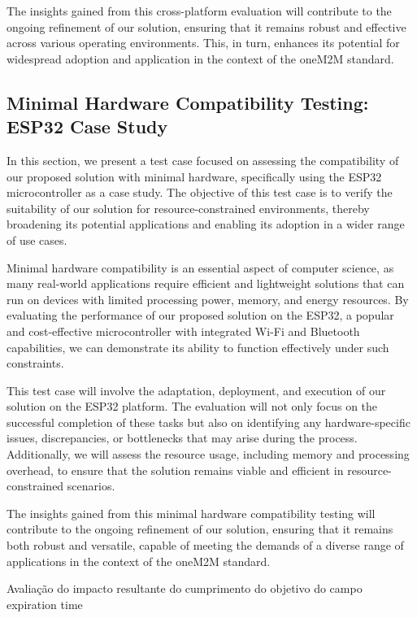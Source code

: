 \documentclass[a4paper,fleqn]{cas-dc}
\begin{document}
The insights gained from this cross-platform evaluation will contribute to the ongoing refinement of our solution, ensuring that it remains robust and effective across various operating environments. This, in turn, enhances its potential for widespread adoption and application in the context of the oneM2M standard.

\subsection{Minimal Hardware Compatibility Testing: ESP32 Case Study}

In this section, we present a test case focused on assessing the compatibility of our proposed solution with minimal hardware, specifically using the ESP32 microcontroller as a case study. The objective of this test case is to verify the suitability of our solution for resource-constrained environments, thereby broadening its potential applications and enabling its adoption in a wider range of use cases.

Minimal hardware compatibility is an essential aspect of computer science, as many real-world applications require efficient and lightweight solutions that can run on devices with limited processing power, memory, and energy resources. By evaluating the performance of our proposed solution on the ESP32, a popular and cost-effective microcontroller with integrated Wi-Fi and Bluetooth capabilities, we can demonstrate its ability to function effectively under such constraints.

This test case will involve the adaptation, deployment, and execution of our solution on the ESP32 platform. The evaluation will not only focus on the successful completion of these tasks but also on identifying any hardware-specific issues, discrepancies, or bottlenecks that may arise during the process. Additionally, we will assess the resource usage, including memory and processing overhead, to ensure that the solution remains viable and efficient in resource-constrained scenarios.

The insights gained from this minimal hardware compatibility testing will contribute to the ongoing refinement of our solution, ensuring that it remains both robust and versatile, capable of meeting the demands of a diverse range of applications in the context of the oneM2M standard.




Avaliação do impacto resultante do cumprimento do objetivo do campo expiration time
\end{document}
